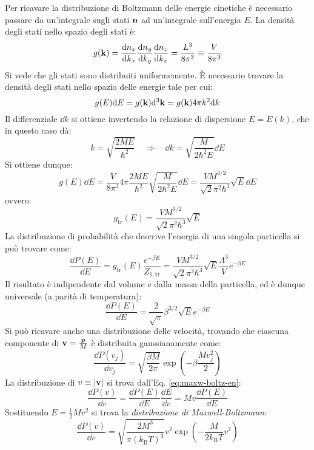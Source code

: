 Per ricavare la distribuzione di Boltzmann delle energie cinetiche è necessario passare da un'integrale sugli stati $ \mathbf{n} $ ad un'integrale sull'energia $ E $. La densità degli stati nello spazio degli stati è:
\begin{equation}
	g(\mathbf{k}) = \frac{\mathrm{d} n_x}{\mathrm{d} k_x} \frac{\mathrm{d} n_y}{\mathrm{d} k_y} \frac{\mathrm{d} n_z}{\mathrm{d} k_z} = \frac{L^3}{8\pi^3} \equiv \frac{V}{8\pi^3}
\end{equation}
Si vede che gli stati sono distribuiti uniformemente. È necessario trovare la densità degli stati nello spazio delle energie tale per cui:
\begin{equation*}
	g(E) \mathrm{d} E = g(\mathbf{k}) \mathrm{d}^3\mathbf{k} = g(\mathbf{k}) 4\pi k^2 \mathrm{d} k
\end{equation*}
Il differenziale $ \dd k $ si ottiene invertendo la relazione di dispersione $ E = E(k) $, che in questo caso dà:
\begin{equation*}
	k = \sqrt{\frac{2M E}{\hbar^2}}
	\quad \Rightarrow \quad
	\dd k = \sqrt{\frac{M}{2\hbar^2 E}} \dd E
\end{equation*}
Si ottiene dunque:
\begin{equation*}
	g(E) \dd E = \frac{V}{8\pi^3} 4 \pi \frac{2M E}{\hbar^2} \sqrt{\frac{M}{2\hbar^2 E}} \dd E = \frac{V M^{3/2}}{\sqrt{2} \pi^2 \hbar^3} \sqrt{E} \dd E
\end{equation*}
ovvero:
\begin{equation}
	g_\text{tr}(E) = \frac{V M^{3/2}}{\sqrt{2} \pi^2 \hbar^3} \sqrt{E}
	\label{eq:en-deg}
\end{equation}
La distribuzione di probabilità che descrive l'energia di una singola particella si può trovare come:
\begin{equation*}
	\frac{\dd P(E)}{\dd E} = g_\text{tr}(E) \frac{e^{- \beta E}}{Z_{1,\text{tr}}} = \frac{V M^{3/2}}{\sqrt{2} \pi^2 \hbar^3} \sqrt{E} \frac{\Lambda^3}{V} e^{-\beta E}
\end{equation*}
Il risultato è indipendente dal volume e dalla massa della particella, ed è dunque universale (a parità di temperatura):
\begin{equation}
	\frac{\dd P(E)}{\dd E} = \frac{2}{\sqrt{\pi}} \beta^{3/2} \sqrt{E} e^{-\beta E}
	\label{eq:maxw-boltz-en}
\end{equation}
Si può ricavare anche una distribuzione delle velocità, trovando che ciascuna componente di $ \mathbf{v} = \frac{\mathbf{p}}{M} $ è distribuita gaussianamente come:
\begin{equation*}
	\frac{\dd P(v_j)}{\dd v_j} = \sqrt{\frac{\beta M}{2\pi}} \exp \left( -\beta \frac{M v_j^2}{2} \right)
\end{equation*}
La distribuzione di $ v \equiv \left\lvert\mathbf{v}\right\rvert $ si trova dall'Eq. \ref{eq:maxw-boltz-en}:
\begin{equation*}
	\frac{\dd P(v)}{\dd v} = \frac{\dd P(E)}{\dd E} \frac{\dd E}{\dd v} = M v \frac{\dd P(E)}{\dd E}
\end{equation*}
Sostituendo $ E = \frac{1}{2} M v^2 $ si trova la \textit{distribuzione di Maxwell-Boltzmann}:
\begin{equation}
	\frac{\dd P(v)}{\dd v} = \sqrt{\frac{2 M^3}{\pi (k_\text{B} T)^3}} v^2 \exp \left( - \frac{M}{2 k_\text{B} T} v^2 \right)
\end{equation}

